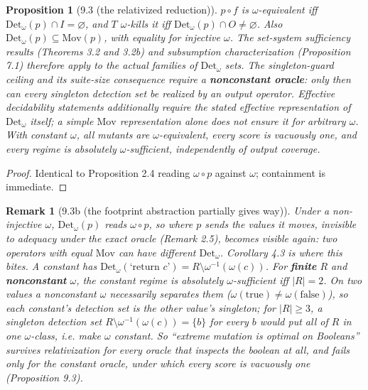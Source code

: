 \documentclass[conference]{IEEEtran}
\newcommand{\Mov}{\mathrm{Mov}}
\newcommand{\Det}{\mathrm{Det}}
\theoremstyle{run}
\newtheorem*{proposition}{Proposition}
\newtheorem*{remark}{Remark}
\begin{document}
\begin{proposition}[9.3 (the relativized reduction)]
$p\circ f$ is $\omega$-equivalent iff $\Det_\omega(p)\cap I=\varnothing$, and $T$ $\omega$-kills it iff $\Det_\omega(p)\cap O\ne\varnothing$. Also $\Det_\omega(p)\subseteq\Mov(p)$, with equality for injective $\omega$. The set-system sufficiency results (Theorems 3.2 and 3.2b) and subsumption characterization (Proposition 7.1) therefore apply to the actual families of $\Det_\omega$ sets. The singleton-guard ceiling and its suite-size consequence require a \textbf{nonconstant oracle}: only then can every singleton detection set be realized by an output operator. Effective decidability statements additionally require the stated effective representation of $\Det_\omega$ itself; a simple $\Mov$ representation alone does not ensure it for arbitrary $\omega$. With constant $\omega$, all mutants are $\omega$-equivalent, every score is vacuously one, and every regime is absolutely $\omega$-sufficient, independently of output coverage.
\end{proposition}

\begin{proof}
Identical to Proposition 2.4 reading $\omega\circ p$ against $\omega$; containment is immediate.
\end{proof}

\begin{remark}[9.3b (the footprint abstraction partially gives way)]
Under a non-injective $\omega$, $\Det_\omega(p)$ reads $\omega \circ p$, so \emph{where} $p$ sends the values it moves, invisible to adequacy under the exact oracle (Remark 2.5), becomes visible again: two operators with equal $\Mov$ can have different $\Det_\omega$. Corollary 4.3 is where this bites. A constant has $\Det_\omega(\text{`return }c\text{'}) = R \setminus \omega^{-1}(\omega(c))$. For \textbf{finite} $R$ and \textbf{nonconstant} $\omega$, the constant regime is absolutely $\omega$-sufficient iff $|R| = 2$. On two values a nonconstant $\omega$ necessarily separates them ($\omega(\mathrm{true}) \neq \omega(\mathrm{false})$), so each constant's detection set is the other value's singleton; for $|R| \ge 3$, a singleton detection set $R \setminus \omega^{-1}(\omega(c)) = \{b\}$ for every $b$ would put all of $R$ in one $\omega$-class, i.e. make $\omega$ constant. So ``extreme mutation is optimal on Booleans'' survives relativization for every oracle that inspects the boolean at all, and fails only for the constant oracle, under which every score is vacuously one (Proposition 9.3).
\end{remark}
\end{document}
